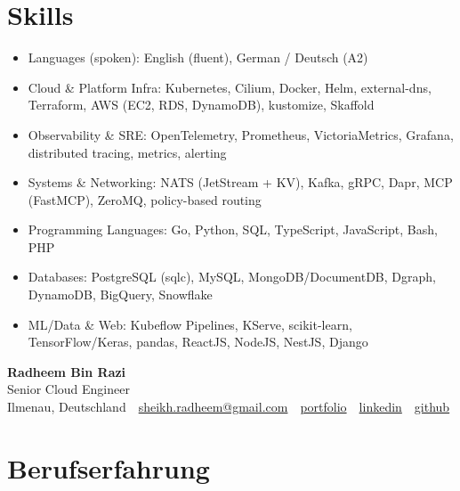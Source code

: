 \documentclass[10pt,a4paper]{resume}
\makeatletter
\newcommand{\Portfolio}{https://radheem.github.io/my-cv}
\newcommand{\PortfolioText}{portfolio}
\newcommand{\GitHub}{https://github.com/radheem}
\newcommand{\LinkedIn}{https://www.linkedin.com/in/radheem-razi}
\newcommand{\Email}{sheikh.radheem@gmail.com}
\makeatother
\begin{document}
\section{Skills}

\begin{itemize}[leftmargin=1.4em,nosep,topsep=2pt]
  \item Languages (spoken): English (fluent), German / Deutsch (A2)
  \item Cloud \& Platform Infra: Kubernetes, Cilium, Docker, Helm, external-dns, Terraform, AWS (EC2, RDS, DynamoDB), kustomize, Skaffold
  \item Observability \& SRE: OpenTelemetry, Prometheus, VictoriaMetrics, Grafana, distributed tracing, metrics, alerting
  \item Systems \& Networking: NATS (JetStream + KV), Kafka, gRPC, Dapr, MCP (FastMCP), ZeroMQ, policy-based routing
  \item Programming Languages: Go, Python, SQL, TypeScript, JavaScript, Bash, PHP
  \item Databases: PostgreSQL (sqlc), MySQL, MongoDB/DocumentDB, Dgraph, DynamoDB, BigQuery, Snowflake
  \item ML/Data \& Web: Kubeflow Pipelines, KServe, scikit-learn, TensorFlow/Keras, pandas, ReactJS, NodeJS, NestJS, Django
\end{itemize}

\clearpage
{}

\begin{center}
  {\huge\bfseries Radheem Bin Razi}\\[3pt]
  {\large Senior Cloud Engineer}\\[6pt]
  \small
  Ilmenau, Deutschland \,\textbar\,
  \href{mailto:\Email}{\Email} \,\textbar\,
  \href{\Portfolio}{\PortfolioText} \,\textbar\,
  \href{\LinkedIn}{linkedin} \,\textbar\,
  \href{\GitHub}{github}
\end{center}
\vspace{2pt}

\section{Berufserfahrung}
\end{document}
